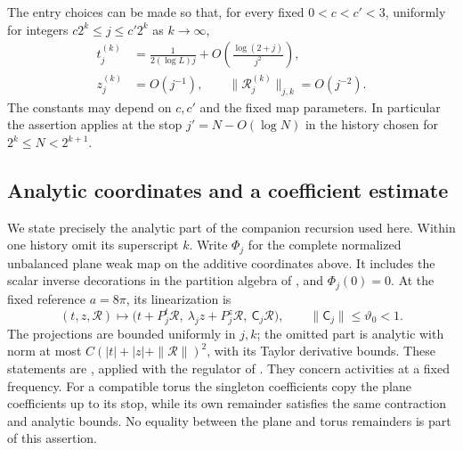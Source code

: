 \begin{proposition}\label{trj:trajectory}
The entry choices can be made so that, for every fixed
\(0<c<c'<3\), uniformly for integers
\(c2^k\le j\le c'2^k\) as \(k\to\infty\),
\begin{equation}\label{trj:unbalanced-conclusion}
 \begin{split}
 t_j^{(k)}&=\frac{1}{2(\log L)j}
                  +O\!\left(\frac{\log(2+j)}{j^2}\right),\\
 z_j^{(k)}&=O(j^{-1}),\qquad
 \|\mathcal R_j^{(k)}\|_{j,k}=O(j^{-2}).
 \end{split}
\end{equation}
The constants may depend on \(c,c'\) and the fixed map parameters.
In particular the assertion applies at the stop \(j'=N-O(\log N)\)
in the history chosen for \(2^k\le N<2^{k+1}\).
\end{proposition}

\subsection{Analytic coordinates and a coefficient estimate}

We state precisely the analytic part of the companion recursion used
here.  Within one history omit its superscript \(k\).  Write \(\Phi_j\)
for the complete normalized unbalanced plane weak map on the additive
coordinates above.  It includes the scalar inverse decorations in the
partition algebra of \cite[Proposition~4.8]{B}, and \(\Phi_j(0)=0\).
At the fixed reference \(a=8\pi\), its linearization is
\begin{equation}\label{trj:triangular}
 (t,z,\mathcal R)\longmapsto
 \bigl(t+P_j^t\mathcal R,\ \lambda_jz+P_j^z\mathcal R,
                              \ \mathsf C_j\mathcal R\bigr),
 \qquad \|\mathsf C_j\|\le\vartheta_0<1.
\end{equation}
The projections are bounded uniformly in \(j,k\); the omitted part is
analytic with norm at most \(C(|t|+|z|+\|\mathcal R\|)^2\), with its
Taylor derivative bounds.  These statements are
\cite[Proposition~8.3]{B}, applied with the regulator of
\cite[Lemma~9.2]{B}.  They concern activities at a fixed frequency.
For a compatible torus the singleton coefficients copy the plane
coefficients up to its stop, while its own remainder satisfies the
same contraction and analytic bounds.  No equality between the plane
and torus remainders is part of this assertion.

